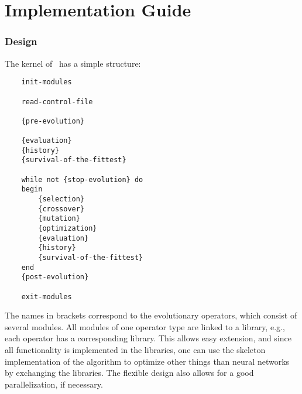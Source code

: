 
\part{\ENZO Implementation Guide} %








\section{Design}
The kernel of \ENZO\ has a simple structure:

\begin{verbatim}
    init-modules

    read-control-file

    {pre-evolution}
    
    {evaluation}
    {history}
    {survival-of-the-fittest}
    
    while not {stop-evolution} do
    begin
        {selection}
        {crossover}
        {mutation}
        {optimization}
        {evaluation}
        {history}
        {survival-of-the-fittest}
    end
    {post-evolution}

    exit-modules
\end{verbatim}

The names in brackets correspond to the evolutionary operators,
which consist of several modules.
All modules of one operator type are linked to a library, e.g.,
each operator has a corresponding library.
This allows easy extension, and since all functionality is implemented
in the libraries, one can use the skeleton implementation of
the algorithm to optimize other things than neural networks by exchanging the
libraries.
The flexible design also allows for a good parallelization, if necessary.

